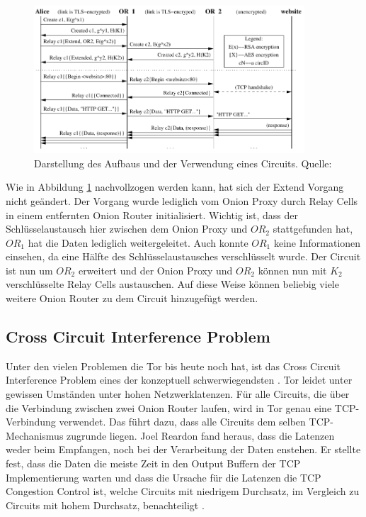 \documentclass[fleqn,envcountsame,runningheads,10pt,a4paper]{llncs}
\begin{document}
\begin{figure}[t]
  \begin{center}
    \includegraphics[width=0.9\textwidth]{pics/construction.pdf}
    \caption{Darstellung des Aufbaus und der Verwendung eines Circuits. Quelle: \cite{tor}}
    \label{fig:construction} 
  \end{center} 
\end{figure}

\newpage


Wie in Abbildung \ref{fig:construction} nachvollzogen werden kann, hat sich der 
Extend Vorgang nicht geändert. Der Vorgang wurde lediglich vom Onion Proxy durch 
Relay Cells in einem entfernten Onion Router initialisiert. Wichtig ist, dass 
der Schlüsselaustausch hier zwischen dem Onion Proxy und $\textit{OR}_2$ 
stattgefunden hat, $\textit{OR}_1$ hat die Daten lediglich weitergeleitet. Auch 
konnte $\textit{OR}_1$ keine Informationen einsehen, da eine Hälfte des 
Schlüsselaustausches verschlüsselt wurde. Der Circuit ist nun um $\textit{OR}_2$ 
erweitert und der Onion Proxy und $\textit{OR}_2$ können nun mit $K_2$ 
verschlüsselte Relay Cells austauschen. Auf diese Weise können beliebig viele 
weitere Onion Router zu dem Circuit hinzugefügt werden.

\subsection{Cross Circuit Interference Problem}
\label{sec:crosscircuitinterference} 

Unter den vielen Problemen die Tor bis heute noch hat, ist das Cross Circuit 
Interference Problem eines der konzeptuell schwerwiegendsten 
\cite{tor_improvements}. Tor leidet unter gewissen Umständen unter hohen 
Netzwerklatenzen. Für alle Circuits, die über die Verbindung zwischen zwei Onion 
Router laufen, wird in Tor genau eine TCP-Verbindung verwendet. Das führt dazu, 
dass alle Circuits dem selben TCP-Mechanismus zugrunde liegen. Joel Reardon fand 
heraus, dass die Latenzen weder beim Empfangen, noch bei der Verarbeitung der 
Daten enstehen. Er stellte fest, dass die Daten die meiste Zeit in den Output 
Buffern der TCP Implementierung warten und dass die Ursache für die Latenzen die 
TCP Congestion Control ist, welche Circuits mit niedrigem Durchsatz, im 
Vergleich zu Circuits mit hohem Durchsatz, benachteiligt 
\cite{tcp-over-dtls-thesis,tcp-over-dtls}.
\end{document}

